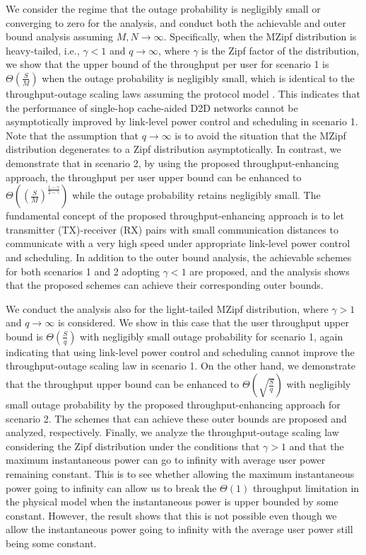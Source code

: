 \documentclass[journal,draftclsnofoot,onecolumn,12pt,twoside]{IEEEtran}
\begin{document}
We consider the regime that the outage probability is negligibly small or converging to zero for the analysis, and conduct both the achievable and outer bound analysis assuming $M,N\to\infty$. Specifically, when the MZipf distribution is heavy-tailed, i.e., $\gamma<1$ and $q\to\infty$, where $\gamma$ is the Zipf factor of the distribution, we show that the upper bound of the throughput per user for scenario 1 is $\Theta\left(\frac{S}{M}\right)$ when the outage probability is negligibly small, which is identical to the throughput-outage scaling laws assuming the protocol model \cite{lee2019throughput}. This indicates that the performance of single-hop cache-aided D2D networks cannot be asymptotically improved by link-level power control and scheduling in scenario 1. Note that the assumption that $q\to\infty$ is to avoid the situation that the MZipf distribution degenerates to a Zipf distribution asymptotically. In contrast, we demonstrate that in scenario 2, by using the proposed throughput-enhancing approach, the throughput per user upper bound can be enhanced to $\Theta\left(\left(\frac{S}{M}\right)^{\frac{1-\gamma}{2-\gamma}}\right)$ while the outage probability retains negligibly small. The fundamental concept of the proposed throughput-enhancing approach is to let transmitter (TX)-receiver (RX) pairs with small communication distances to communicate with a very high speed under appropriate link-level power control and scheduling. In addition to the outer bound analysis, the achievable schemes for both scenarios 1 and 2 adopting $\gamma<1$ are proposed, and the analysis shows that the proposed schemes can achieve their corresponding outer bounds.

We conduct the analysis also for the light-tailed MZipf distribution, where $\gamma>1$ and $q\to\infty$ is considered. We show in this case that the user throughput upper bound is $\Theta\left(\frac{S}{q}\right)$ with negligibly small outage probability for scenario 1, again indicating that using link-level power control and scheduling cannot improve the throughput-outage scaling law in scenario 1. On the other hand, we demonstrate that the throughput upper bound can be enhanced to $\Theta\left(\sqrt{\frac{S}{q}}\right)$ with negligibly small outage probability by the proposed throughput-enhancing approach for scenario 2. The schemes that can achieve these outer bounds are proposed and analyzed, respectively. Finally, we analyze the throughput-outage scaling law considering the Zipf distribution under the conditions that $\gamma>1$ and that the maximum instantaneous power can go to infinity with average user power remaining constant. This is to see whether allowing the maximum instantaneous power going to infinity can allow us to break the $\Theta(1)$ throughput limitation in the physical model when the instantaneous power is upper bounded by some constant. However, the result shows that this is not possible even though we allow the instantaneous power going to infinity with the average user power still being some constant.
\end{document}
